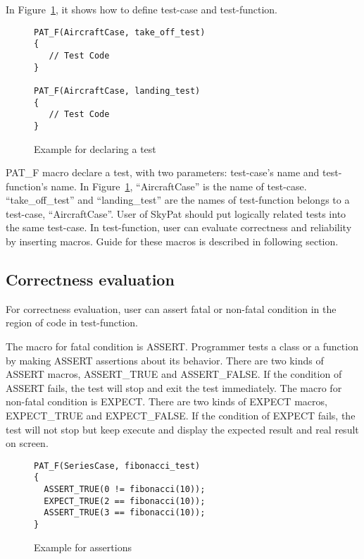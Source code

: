 \documentclass[final]{ols}
\begin{document}
In Figure~\ref{aircraftcase}, it shows how to define test-case and test-function.

\begin{figure}[h]
\lstset{language=C++}
\begin{lstlisting}[frame=single]
PAT_F(AircraftCase, take_off_test)
{
   // Test Code
}

PAT_F(AircraftCase, landing_test)
{
   // Test Code
}
\end{lstlisting}
\caption{Example for declaring a test}
\label{aircraftcase}
\end{figure}

PAT\_F macro declare a test, with two parameters: test-case's name and test-function's name.
In Figure~\ref{aircraftcase}, ``AircraftCase'' is the name of test-case. 
``take\_off\_test'' and ``landing\_test'' are the names of test-function belongs to a test-case, ``AircraftCase''.
User of SkyPat should put logically related tests into the same test-case.
In test-function, user can evaluate correctness and reliability by inserting macros.
Guide for these macros is described in following section.

\subsection{Correctness evaluation}
For correctness evaluation, user can assert fatal or non-fatal condition in the region of code in test-function.

The macro for fatal condition is ASSERT.
Programmer tests a class or a function by making ASSERT assertions about its behavior. 
There are two kinds of ASSERT macros, ASSERT\_TRUE and ASSERT\_FALSE. 
If the condition of ASSERT fails, the test will stop and exit the test immediately. 
The macro for non-fatal condition is EXPECT.
There are two kinds of EXPECT macros, EXPECT\_TRUE and EXPECT\_FALSE.
If the condition of EXPECT fails, the test will not stop but keep execute and display the expected result and real result on screen.

\begin{figure}[h]
\lstset{language=C++}
\begin{lstlisting}[frame=single]
PAT_F(SeriesCase, fibonacci_test)
{
  ASSERT_TRUE(0 != fibonacci(10));
  EXPECT_TRUE(2 == fibonacci(10));
  ASSERT_TRUE(3 == fibonacci(10));
}
\end{lstlisting}
\caption{Example for assertions}
\label{assert_example}
\end{figure}
\end{document}
